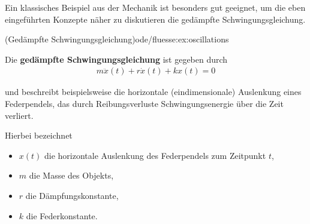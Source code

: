 \documentclass[letterpaper,10pt,english]{jupyterBook}
\begin{document}
\par
Ein klassisches Beispiel aus der Mechanik ist besonders gut geeignet, um die eben eingeführten Konzepte näher zu diskutieren   die gedämpfte Schwingungsgleichung.
\begin{example}{(Gedämpfte Schwingungsgleichung)}{ode/fluesse:ex:oscillations}



\par
Die \textbf{gedämpfte Schwingungsgleichung} ist gegeben durch
\begin{align}\label{equation:ode/fluesse:eq:schwingungsgleichung}
m\ddot{x}(t) + r\dot{x}(t) + kx(t)=0
\end{align}
\par
und beschreibt beispielsweise die horizontale (eindimensionale) Auslenkung eines Federpendels, das durch Reibungsverluste Schwingungsenergie über die Zeit verliert.

\par
Hierbei bezeichnet
\begin{itemize}
\item {} 
\par
\(x(t)\) die horizontale Auslenkung des Federpendels zum Zeitpunkt \(t\),

\item {} 
\par
\(m\) die Masse des Objekts,

\item {} 
\par
\(r\) die Dämpfungskonstante,

\item {} 
\par
\(k\) die Federkonstante.

\end{itemize}


\end{example}
\end{document}
